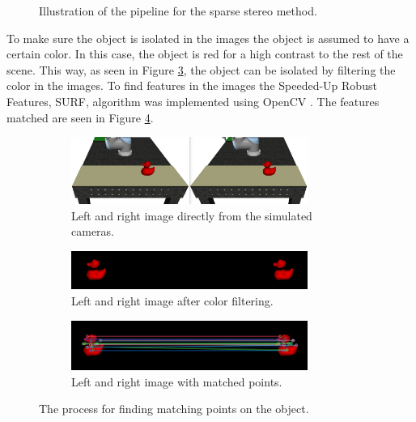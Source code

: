 \documentclass[../main.tex]{subfiles}
\begin{document}
\begin{figure}[H]
    \centering
    \noindent\makebox[\textwidth][c]{}
    \caption{Illustration of the pipeline for the sparse stereo method.}
    \label{fig:sparse_stereo_pipeline}
\end{figure}

To make sure the object is isolated in the images the object is assumed to have a certain color. In this case, the object is red for a high contrast to the rest of the scene. This way, as seen in Figure \ref{subfig:filtered_duck}, the object can be isolated by filtering the color in the images. To find features in the images the Speeded-Up Robust Features, SURF, algorithm was implemented using OpenCV \cite{opencv}. The features matched are seen in Figure \ref{subfig:matched_duck}.

\begin{figure}[H]
    \centering
    \begin{subfigure}[t]{\textwidth}
        \centering
        \captionsetup{width=0.85\textwidth}
        \includegraphics[width=0.85\textwidth]{figures/sparse_stereo/sparse_input_duck.png}
        \caption{Left and right image directly from the simulated cameras.}
        \label{subfig:left_right_input}
    \end{subfigure}
    
    \begin{subfigure}[t]{\textwidth}
        \centering
        \captionsetup{width=0.85\textwidth}
        \includegraphics[width=0.85\textwidth]{figures/sparse_stereo/colour_filtered_duck.png}
        \caption{Left and right image after color filtering.}
        \label{subfig:filtered_duck}
    \end{subfigure}
    
    \begin{subfigure}[t]{\textwidth}
        \centering
        \captionsetup{width=0.85\textwidth}
        \includegraphics[width=0.85\textwidth]{figures/sparse_stereo/matched_points_duck.png}
        \caption{Left and right image with matched points.}
        \label{subfig:matched_duck}
    \end{subfigure}
    \caption{The process for finding matching points on the object.}
    \label{fig:my_label}
\end{figure}
\end{document}
